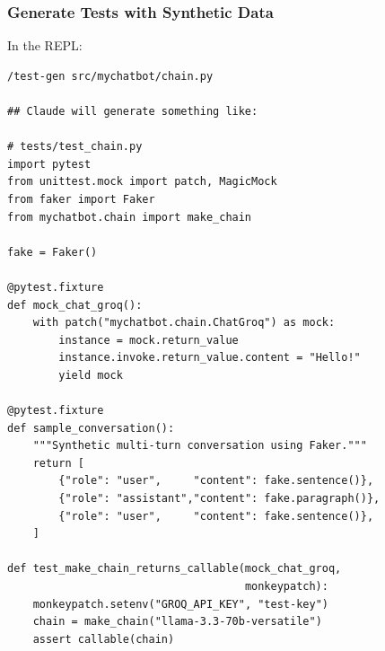 \begin{frame}[fragile]\frametitle{Generate Tests with Synthetic Data}
In the REPL:
\begin{lstlisting}
/test-gen src/mychatbot/chain.py

## Claude will generate something like:

# tests/test_chain.py
import pytest
from unittest.mock import patch, MagicMock
from faker import Faker
from mychatbot.chain import make_chain

fake = Faker()

@pytest.fixture
def mock_chat_groq():
    with patch("mychatbot.chain.ChatGroq") as mock:
        instance = mock.return_value
        instance.invoke.return_value.content = "Hello!"
        yield mock

@pytest.fixture
def sample_conversation():
    """Synthetic multi-turn conversation using Faker."""
    return [
        {"role": "user",     "content": fake.sentence()},
        {"role": "assistant","content": fake.paragraph()},
        {"role": "user",     "content": fake.sentence()},
    ]

def test_make_chain_returns_callable(mock_chat_groq,
                                     monkeypatch):
    monkeypatch.setenv("GROQ_API_KEY", "test-key")
    chain = make_chain("llama-3.3-70b-versatile")
    assert callable(chain)
\end{lstlisting}
\end{frame}


